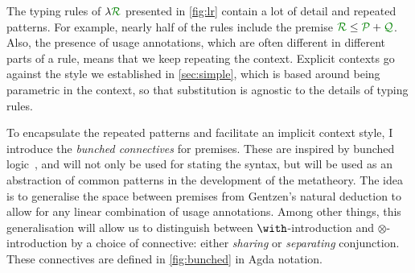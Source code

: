 
The typing rules of $\name$ presented in \cref{fig:lr} contain a lot of detail
and repeated patterns.
For example, nearly half of the rules include the premise
$\grR \leq \grP + \grQ$.
Also, the presence of usage annotations, which are often different in different
parts of a rule, means that we keep repeating the context.
Explicit contexts go against the style we established in \cref{sec:simple},
which is based
around being parametric in the context, so that substitution is agnostic to the
details of typing rules.

To encapsulate the repeated patterns and facilitate an implicit context style,
I introduce the \emph{bunched connectives} for premises.
These are inspired by bunched logic~\citep{oHP99}, and will not only be used for
stating the syntax, but will be used as an abstraction of common patterns in the
development of the metatheory.
The idea is to generalise the space between premises from Gentzen's natural
deduction to allow for any linear combination of usage annotations.
Among other things, this generalisation will allow us to distinguish between
$\with$-introduction and $\otimes$-introduction by a choice of connective:
either \emph{sharing} or \emph{separating} conjunction.
These connectives are defined in \cref{fig:bunched} in Agda notation.

